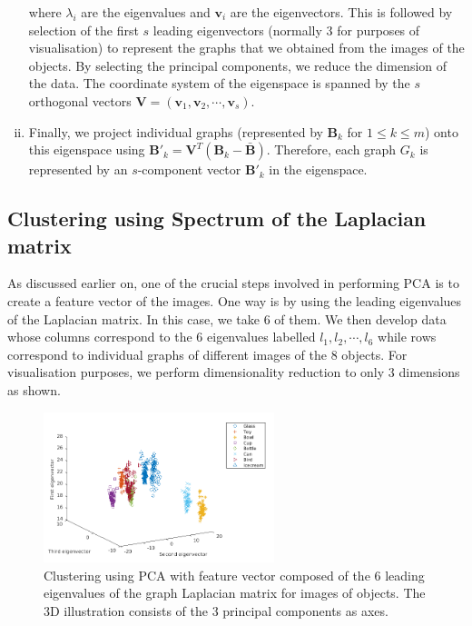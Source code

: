 \documentclass[10pt,a4paper]{article}
\begin{document}
\begin{enumerate}[i)]
\begin{equation}
	\end{equation}
	where $\lambda_i$ are the eigenvalues and $\mathbf{v}_i$ are the eigenvectors. This is followed by selection of the first $s$ leading eigenvectors (normally $3$ for purposes of visualisation) to represent the graphs that we obtained from the images of the objects. By selecting the principal components, we reduce the dimension of the data. The coordinate system of the eigenspace is spanned by the $s$ orthogonal vectors $\mathbf{V} = (\mathbf{v}_1, \mathbf{v}_2, \cdots, \mathbf{v}_s)$. 
	\item Finally, we project individual graphs (represented by $\mathbf{B}_k$ for $1\leq k \leq m$) onto this eigenspace using $\mathbf{B}'_k = \mathbf{V}^T (\mathbf{B}_k -\mathbf{\bar{B}})$. Therefore, each graph $G_k$ is represented by an $s$-component vector $\mathbf{B}'_k$ in the eigenspace.	 
\end{enumerate}

\subsection{Clustering using Spectrum of the Laplacian matrix}
As discussed earlier on, one of the crucial steps involved in performing PCA is to create a feature vector of the images. One way is by using the leading eigenvalues of the Laplacian matrix. In this case, we take $6$ of them. We then develop data whose columns correspond to the  $6$ eigenvalues labelled $l_1,l_2,\cdots,l_6$  while rows correspond to individual graphs of different images of the $8$ objects. For visualisation purposes, we perform dimensionality reduction to only $3$ dimensions as shown.
\begin{figure}[H]
	\centering
	\includegraphics[width=0.6\textwidth]{images/No-longrange.png}
	\caption{Clustering using PCA with feature vector composed of the $6$ leading eigenvalues of the graph Laplacian matrix for images of objects. The $3$D illustration consists of the $3$ principal components as axes.}
	\label{}
\end{figure}
\end{document}

